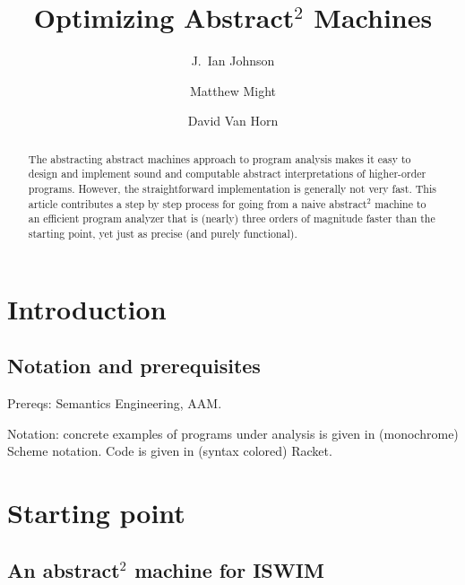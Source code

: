 \documentclass{llncs}
\begin{document}
\title{Optimizing Abstract$^2$ Machines}
%
\frontmatter          %
%
\author{J.~Ian Johnson \and Matthew Might \and David Van Horn}

\maketitle              %

\begin{abstract}
The abstracting abstract machines approach to program analysis makes
it easy to design and implement sound and computable abstract
interpretations of higher-order programs.
%
However, the straightforward implementation is generally
not very fast.
%
This article contributes a step by step process for going from a naive
abstract$^2$ machine to an efficient program analyzer that is (nearly)
three orders of magnitude faster than the starting point, yet just as
precise (and purely functional).
\end{abstract}
%
\section{Introduction}

\subsection{Notation and prerequisites}

Prereqs: Semantics Engineering, AAM.

Notation: concrete examples of programs under analysis is given in
(monochrome) Scheme notation.  Code is given in (syntax colored)
Racket.

\newpage
\section{Starting point}
\subsection{An abstract$^2$ machine for ISWIM}
\end{document}

